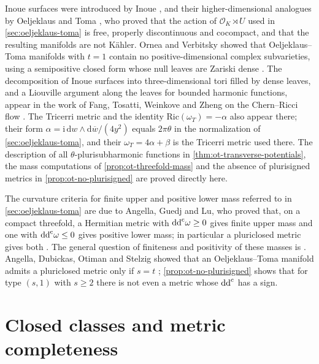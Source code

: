 Inoue surfaces were introduced by Inoue \cite{Inoue74}, and their higher-dimensional analogues by Oeljeklaus and Toma \cite[Section~1 and Proposition~2.5]{OT05}, who proved that the action of $\mathcal O_K\rtimes U$ used in \cref{sec:oeljeklaus-toma} is free, properly discontinuous and cocompact, and that the resulting manifolds are not K\"ahler. Ornea and Verbitsky showed that Oeljeklaus--Toma manifolds with $t=1$ contain no positive-dimensional complex subvarieties, using a semipositive closed form whose null leaves are Zariski dense \cite{OV11OT}. The decomposition of Inoue surfaces into three-dimensional tori filled by dense leaves, and a Liouville argument along the leaves for bounded harmonic functions, appear in the work of Fang, Tosatti, Weinkove and Zheng on the Chern--Ricci flow \cite[Section~2, Lemma~2.1 and its proof, pp.~3166--3168]{FTWZ16}. The Tricerri metric and the identity $\mathrm{Ric}(\omega_T)=-\alpha$ also appear there; their form $\alpha=\mathrm i\,\mathrm dw\wedge\mathrm d\overline w/(4y^2)$ equals $2\pi\theta$ in the normalization of \cref{sec:oeljeklaus-toma}, and their $\omega_T=4\alpha+\beta$ is the Tricerri metric used there. The description of all $\theta$-plurisubharmonic functions in \cref{thm:ot-transverse-potentials}, the mass computations of \cref{prop:ot-threefold-mass} and the absence of plurisigned metrics in \cref{prop:ot-no-plurisigned} are proved directly here.

The curvature criteria for finite upper and positive lower mass referred to in \cref{sec:oeljeklaus-toma} are due to Angella, Guedj and Lu, who proved that, on a compact threefold, a Hermitian metric with $\mathrm{dd}^{\mathrm{c}}\omega\geq0$ gives finite upper mass and one with $\mathrm{dd}^{\mathrm{c}}\omega\leq0$ gives positive lower mass; in particular a pluriclosed metric gives both \cite[Theorem~B, p.~4632]{AGL23}. The general question of finiteness and positivity of these masses is \cite[Problem~1.8, p.~4635]{AGL23}. Angella, Dubickas, Otiman and Stelzig showed that an Oeljeklaus--Toma manifold admits a pluriclosed metric only if $s=t$ \cite[Corollary~3, pp.~220 and~228]{ADOS24}; \cref{prop:ot-no-plurisigned} shows that for type $(s,1)$ with $s\geq2$ there is not even a metric whose $\mathrm{dd}^{\mathrm{c}}$ has a sign.

\section{Closed classes and metric completeness}
\label{sec:history-completeness}

